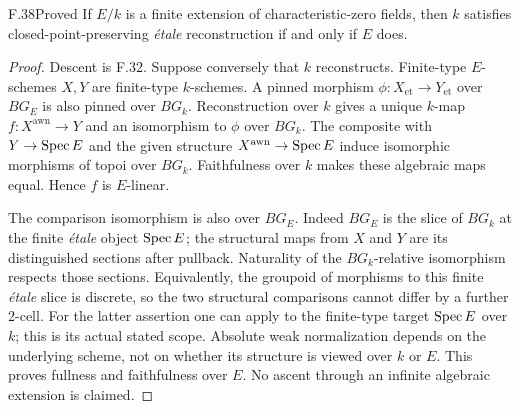 \begin{claim}{F.38}{Proved}
If $E/k$ is a finite extension of characteristic-zero fields,
then $k$ satisfies closed-point-preserving \emph{\'etale}
reconstruction if and only if $E$ does.
\end{claim}
\begin{proof}
Descent is F.32. Suppose conversely that $k$ reconstructs.
Finite-type $E$-schemes $X,Y$ are finite-type $k$-schemes.
A pinned morphism $\phi:X_{\mathrm{et}}\to Y_{\mathrm{et}}$
over $BG_E$ is also pinned over $BG_k$. Reconstruction over
$k$ gives a unique $k$-map $f:X^{\mathrm{awn}}\to Y$ and
an isomorphism to $\phi$ over $BG_k$.
The composite with $Y\to\operatorname{Spec} E$ and the given structure
$X^{\mathrm{awn}}\to\operatorname{Spec} E$ induce isomorphic morphisms
of topoi over $BG_k$. Faithfulness over $k$ makes these
algebraic maps equal. Hence $f$ is $E$-linear.

The comparison isomorphism is also over $BG_E$.
Indeed $BG_E$ is the slice of $BG_k$ at the finite
\emph{\'etale} object $\operatorname{Spec} E$; the structural maps from
$X$ and $Y$ are its distinguished sections after pullback.
Naturality of the $BG_k$-relative isomorphism respects those
sections. Equivalently, the groupoid of morphisms to this
finite \emph{\'etale} slice is discrete, so the two structural
comparisons cannot differ by a further $2$-cell.
For the latter assertion one can apply
\citet[Proposition~2.22]{F_CHW2024} to the finite-type target
$\operatorname{Spec} E$ over $k$; this is its actual stated scope.
Absolute weak normalization depends on the underlying scheme,
not on whether its structure is viewed over $k$ or $E$.
This proves fullness and faithfulness over $E$.
No ascent through an infinite algebraic extension is claimed.
\end{proof}

